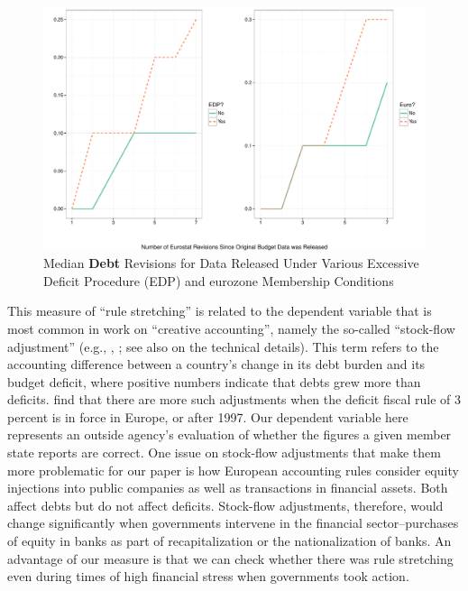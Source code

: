 \documentclass[]{article}
\begin{document}
\begin{figure}
    \begin{center}
        \caption{Median \textbf{Debt} Revisions for Data Released Under Various Excessive Deficit Procedure (EDP) and eurozone Membership Conditions}
        \label{median_debt_revisions_edp_eu}
        \includegraphics[scale=0.55]{figures/median_debt_revisions_edp_euro.pdf}
    \end{center}
\end{figure}

This measure of ``rule stretching'' is related to the dependent variable that is most common in work on ``creative accounting'', namely the so-called ``stock-flow adjustment'' (e.g., \citealt{vonHagenWolff2006}, \citealt{Alt2014}; see also \citealt{Seiferling2013} on the technical details).  This term refers to the accounting difference between a country's change in its debt burden and its budget deficit, where positive numbers indicate that debts grew more than deficits.  \cite{vonHagenWolff2006} find that there are more such adjustments when the deficit fiscal rule of 3 percent is in force in Europe, or after 1997.  Our dependent variable here represents an outside agency's evaluation of whether the figures a given member state reports are correct.  One issue on stock-flow adjustments that make them more problematic for our paper is how European accounting rules consider equity injections into public companies as well as transactions in financial assets. Both affect debts but do not affect deficits. Stock-flow adjustments, therefore, would change significantly when governments intervene in the financial sector--purchases of equity in banks as part of recapitalization or the nationalization of banks.  An advantage of our measure is that we can check whether there was rule stretching even during times of high financial stress when governments took action.
\end{document}
